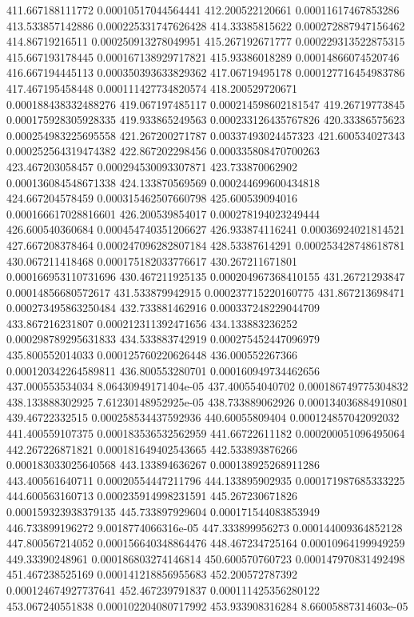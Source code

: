 {411.667188111772 0.00010517044564441
412.200522120661 0.00011617467853286
413.533857142886 0.000225331747626428
414.33385815622 0.000272887947156462
414.86719216511 0.000250913278049951
415.267192671777 0.000229313522875315
415.667193178445 0.000167138929717821
415.93386018289 0.00014866074520746
416.667194445113 0.000350393633829362
417.06719495178 0.000127716454983786
417.467195458448 0.000111427734820574
418.200529720671 0.000188438332488276
419.067197485117 0.000214598602181547
419.26719773845 0.000175928305928335
419.933865249563 0.000233126435767826
420.33386575623 0.000254983225695558
421.267200271787 0.00337493024457323
421.600534027343 0.000252564319474382
422.867202298456 0.000335808470700263
423.467203058457 0.000294530093307871
423.733870062902 0.000136084548671338
424.133870569569 0.000244699600434818
424.667204578459 0.000315462507660798
425.600539094016 0.000166617028816601
426.200539854017 0.000278194023249444
426.600540360684 0.000454740351206627
426.933874116241 0.00036924021814521
427.667208378464 0.000247096282807184
428.53387614291 0.000253428748618781
430.067211418468 0.000175182033776617
430.267211671801 0.000166953110731696
430.467211925135 0.000204967368410155
431.26721293847 0.00014856680572617
431.533879942915 0.000237715220160775
431.867213698471 0.000273495863250484
432.733881462916 0.000337248229044709
433.867216231807 0.000212311392471656
434.133883236252 0.000298789295631833
434.533883742919 0.000275452447096979
435.800552014033 0.000125760220626448
436.000552267366 0.000120342264589811
436.800553280701 0.000160949734462656
437.000553534034 8.06430949171404e-05
437.400554040702 0.000186749775304832
438.133888302925 7.61230148952925e-05
438.733889062926 0.000134036884910801
439.46722332515 0.000258534437592936
440.60055809404 0.000124857042092032
441.400559107375 0.000183536532562959
441.66722611182 0.000200051096495064
442.267226871821 0.000181649402543665
442.533893876266 0.000183033025640568
443.133894636267 0.000138925268911286
443.400561640711 0.00020554447211796
444.133895902935 0.000171987685333225
444.600563160713 0.000235914998231591
445.267230671826 0.000159323938379135
445.733897929604 0.000171544083853949
446.733899196272 9.0018774066316e-05
447.333899956273 0.000144009364852128
447.800567214052 0.000156640348864476
448.467234725164 0.00010964199949259
449.33390248961 0.000186803274146814
450.600570760723 0.000147970831492498
451.467238525169 0.000141218856955683
452.200572787392 0.000124674927737641
452.467239791837 0.000111425356280122
453.067240551838 0.000102204080717992
453.933908316284 8.66005887314603e-05
}
